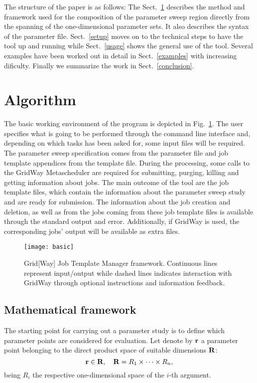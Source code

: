 \documentclass[12pt,a4paper]{article}
\newcommand{\fig}[1]{Fig.~\ref{#1}}
\newcommand{\sect}[1]{Sect.~\ref{#1}}
\begin{document}
The structure of the paper is as follows: The \sect{algorithm} describes the method and framework used for the composition of the parameter sweep region directly from the spanning of the one-dimensional parameter sets. It also describes the syntax of the parameter file. \sect{setup} moves on to the technical steps to have the tool up and running while \sect{usage} shows the general use of the tool. Several examples have been worked out in detail in \sect{examples} with increasing dificulty. Finally we summarize the work in \sect{conclusion}.


\section{Algorithm}\label{algorithm}
The basic working environment of the program is depicted in \fig{basic}. The user specifies what is going to be performed through the command line interface and, depending on which tasks has been asked for, some input files will be required. The parameter sweep specification comes from the parameter file and job template appendices from the template file. During the processing, some calls to the GridWay Metascheduler are required for submitting, purging, killing and getting information about jobs. The main outcome of the tool are the job template files, which contain the information about the parameter sweep study and are ready for submission. The information about the job creation and deletion, as well as from the jobs coming from these job template files is available through the standard output and error. Additionally, if GridWay is used, the corresponding jobs' output will be available as extra files.
\begin{figure}[!ht]
\center
\texttt{[image: basic]}
\caption{Grid[Way] Job Template Manager framework. Continuous lines represent input/output while dashed lines indicates interaction with GridWay through optional instructions and information feedback.}
\label{basic}
\end{figure}

\subsection{Mathematical framework}
The starting point for carrying out a parameter study is to define which parameter points are considered for evaluation. Let denote by ${\bf r}$ a parameter point belonging to the direct product space of suitable dimensions ${\bf R}$:
\begin{equation}
{\bf r} \in {\bf R}, \quad {\bf R}=R_1 \times \cdots \times R_n,
\end{equation}
being $R_i$ the respective one-dimensional space of the $i$-th argument.
\end{document}
